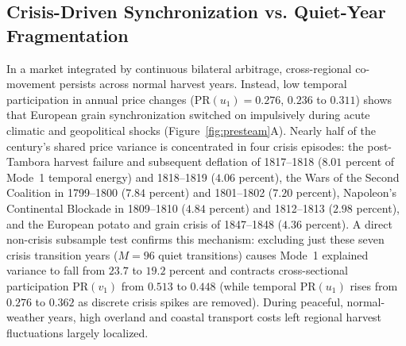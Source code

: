 \documentclass{article}
\begin{document}
\subsection{Crisis-Driven Synchronization vs. Quiet-Year Fragmentation}
In a market integrated by continuous bilateral arbitrage, cross-regional co-movement persists across normal harvest years. Instead, low temporal participation in annual price changes ($\mathrm{PR}(u_1) = 0.276$, $0.236$ to $0.311$) shows that European grain synchronization switched on impulsively during acute climatic and geopolitical shocks (Figure~\ref{fig:presteam}A). Nearly half of the century's shared price variance is concentrated in four crisis episodes: the post-Tambora harvest failure and subsequent deflation of 1817--1818 ($8.01$ percent of Mode~1 temporal energy) and 1818--1819 ($4.06$ percent), the Wars of the Second Coalition in 1799--1800 ($7.84$ percent) and 1801--1802 ($7.20$ percent), Napoleon's Continental Blockade in 1809--1810 ($4.84$ percent) and 1812--1813 ($2.98$ percent), and the European potato and grain crisis of 1847--1848 ($4.36$ percent).
A direct non-crisis subsample test confirms this mechanism: excluding just these seven crisis transition years ($M = 96$ quiet transitions) causes Mode~1 explained variance to fall from $23.7$ to $19.2$ percent and contracts cross-sectional participation $\mathrm{PR}(v_1)$ from $0.513$ to $0.448$ (while temporal $\mathrm{PR}(u_1)$ rises from $0.276$ to $0.362$ as discrete crisis spikes are removed). During peaceful, normal-weather years, high overland and coastal transport costs left regional harvest fluctuations largely localized.
\end{document}
